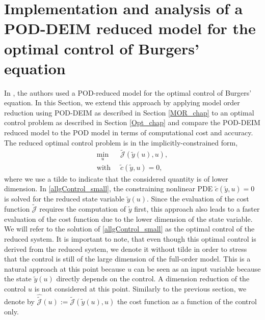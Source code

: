 \chapter{Implementation and analysis of a POD-DEIM reduced model for the optimal control of Burgers' equation}
\label{chap4}
In \cite{KV99}, the authors used a POD-reduced model for the optimal control of Burgers' equation. In this Section, we extend this approach by applying model order reduction using POD-DEIM as described in Section \ref{MOR_chap} to an optimal control problem as described in Section \ref{Opt_chap} and compare the POD-DEIM reduced model to the POD model in terms of computational cost and accuracy. The reduced optimal control problem is in the implicitly-constrained form,
\begin{equation}
\label{allgControl_small}
\begin{split}
\min_{u} \ &\tilde{\mathcal{J}}(\tilde{y}(u),u) ,\\
\text{with } \ &\tilde{c}(\tilde{y},u) = 0,
\end{split}
\end{equation}
where we use a tilde to indicate that the considered quantity is of lower dimension. In \eqref{allgControl_small}, the constraining nonlinear PDE $\tilde{c}(\tilde{y},u) = 0$ is solved for the reduced state variable $\tilde y(u)$. Since the evaluation of the cost function $\tilde{\mathcal{J}}$ requires the computation of $\tilde{y}$ first, this approach also leads to a faster evaluation of the cost function due to the lower dimension of the state variable. We will refer to the solution of \eqref{allgControl_small} as the optimal control of the reduced system. It is important to note, that even though this optimal control is derived from the reduced system, we denote it without tilde in order to stress that the control is still of the large dimension of the full-order model. This is a natural approach at this point because $u$ can be seen as an input variable because the state $\tilde{y}(u)$ directly depends on the control. A dimension reduction of the control $u$ is not considered at this point. Similarly to the previous section, we denote by $\hat{\tilde{\mathcal J}}(u) := \tilde{\mathcal{J}}(\tilde{y}(u),u)$ the cost function as a function of the control only.
\newpage
